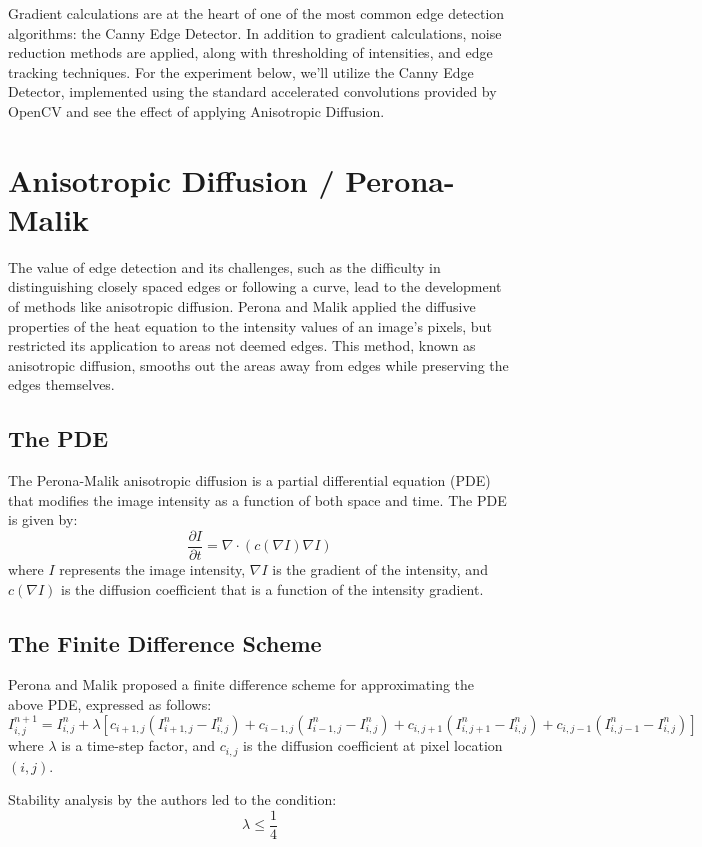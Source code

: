 \documentclass{article}
\begin{document}
Gradient calculations are at the heart of one of the most common edge detection algorithms: the Canny Edge Detector. In addition to gradient calculations, noise reduction methods are applied, along with thresholding of intensities, and edge tracking techniques. For the experiment below, we'll utilize the Canny Edge Detector, implemented using the standard accelerated convolutions provided by OpenCV and see the effect of applying Anisotropic Diffusion. 

\section*{Anisotropic Diffusion / Perona-Malik}
The value of edge detection and its challenges, such as the difficulty in distinguishing closely spaced edges or following a curve, lead to the development of methods like anisotropic diffusion. Perona and Malik applied the diffusive properties of the heat equation to the intensity values of an image's pixels, but restricted its application to areas not deemed edges. This method, known as anisotropic diffusion, smooths out the areas away from edges while preserving the edges themselves.

\subsection*{The PDE}
The Perona-Malik anisotropic diffusion is a partial differential equation (PDE) that modifies the image intensity as a function of both space and time. The PDE is given by:
\[
\frac{\partial I}{\partial t} = \nabla \cdot (c(\nabla I) \nabla I)
\]
where $I$ represents the image intensity, $\nabla I$ is the gradient of the intensity, and $c(\nabla I)$ is the diffusion coefficient that is a function of the intensity gradient.

\subsection*{The Finite Difference Scheme}
Perona and Malik proposed a finite difference scheme for approximating the above PDE, expressed as follows:
\[
I^{n+1}_{i,j} = I^n_{i,j} + \lambda \left[ c_{i+1,j} (I^n_{i+1,j} - I^n_{i,j}) + c_{i-1,j} (I^n_{i-1,j} - I^n_{i,j}) + c_{i,j+1} (I^n_{i,j+1} - I^n_{i,j}) + c_{i,j-1} (I^n_{i,j-1} - I^n_{i,j}) \right]
\]
where $\lambda$ is a time-step factor, and $c_{i,j}$ is the diffusion coefficient at pixel location $(i, j)$.

Stability analysis by the authors led to the condition:
\[
\lambda \leq \frac{1}{4}
\]
\end{document}
